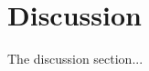 \documentclass[../main.tex]{subfiles}
\begin{document}
\section{Discussion}
\justify 
The discussion section...
\end{document}
